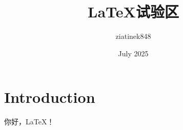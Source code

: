 \documentclass{ctexart} %
\title{LaTeX试验区}
\author{ziatinek848 }
\date{July 2025}
\begin{document}

\maketitle %

\section{Introduction}
\lipsum[1-5]

你好，LaTeX！
\end{document}

